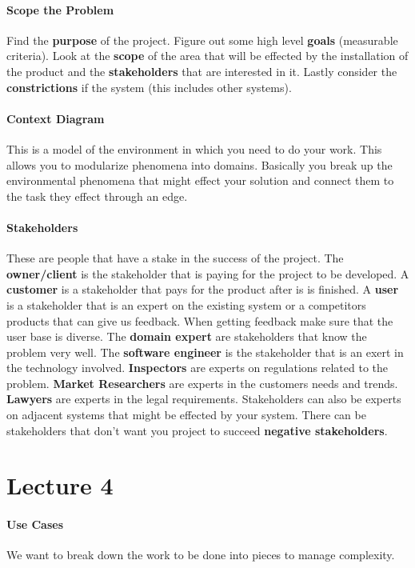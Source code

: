 \documentclass[12pt]{article}
\begin{document}
\paragraph{Scope the Problem} 
\label{par:scope_the_problem}
Find the \textbf{purpose} of the project. Figure out some high level \textbf{goals} (measurable criteria). Look at the \textbf{scope} of the area that will be effected by the installation of the product and the \textbf{stakeholders} that are interested in it. Lastly consider the \textbf{constrictions} if the system (this includes other systems). 

\paragraph{Context Diagram} 
\label{par:context_diagram}
This is a model of the environment in which you need to do your work. This allows you to modularize phenomena into domains. Basically you break up the environmental phenomena that might effect your solution and connect them to the task they effect through an edge.

\paragraph{Stakeholders} 
\label{par:stakeholders}
These are people that have a stake in the success of the project. The \textbf{owner/client} is the stakeholder that is paying for the project to be developed. A \textbf{customer} is a stakeholder that pays for the product after is is finished. A \textbf{user} is a stakeholder that is an expert on the existing system or a competitors products that can give us feedback. When getting feedback make sure that the user base is diverse. The \textbf{domain expert} are stakeholders that know the problem very well. The \textbf{software engineer} is the stakeholder that is an exert in the technology involved. \textbf{Inspectors} are experts on regulations related to the problem. \textbf{Market Researchers} are experts in the customers needs and trends. \textbf{Lawyers} are experts in the legal requirements. Stakeholders can also be experts on adjacent systems that might be effected by your system. There can be stakeholders that don't want you project to succeed \textbf{negative stakeholders}. 

\section*{Lecture 4}
\label{sec:lecture_4}
\paragraph{Use Cases} 
\label{par:use_cases}
We want to break down the work to be done into pieces to manage complexity.
\end{document}
